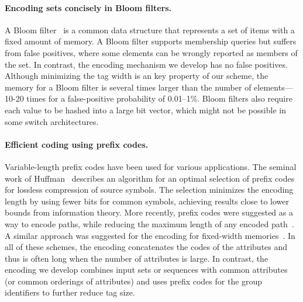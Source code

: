 \paragraph{Encoding sets concisely in Bloom filters.} A Bloom
filter~\cite{Bloom} is a common data structure that represents a set of
items with a fixed amount of memory. A Bloom filter supports membership
queries but suffers from false positives, where some elements can be
wrongly reported as members of the set. In contrast, the encoding
mechanism we develop has no false positives.  Although minimizing the
tag width is an key property of our scheme, the memory for a Bloom
filter is several times larger than the number of elements---10-20 times
for a false-positive probability of 0.01--1\%. Bloom filters also
require each value to be hashed into a large bit vector, which might not
be possible in some switch architectures.

\paragraph{Efficient coding using prefix codes.} Variable-length prefix
codes have been used for various applications. The seminal work of
Huffman~\cite{Huffman} describes an algorithm for an optimal selection
of prefix codes for lossless compression of source symbols. The
selection minimizes the encoding length by using fewer bits for common
symbols, achieving results close to lower bounds from information
theory. More recently, prefix codes were suggested as a way to encode
paths, while reducing the maximum length of any encoded
path~\cite{PathEncoding}. A similar approach was suggested for the
encoding for fixed-width memories~\cite{FixedMemories}. In all of these
schemes, the encoding concatenates the codes of the attributes and thus
is often long when the number of attributes is large. In contrast, the
encoding we develop
combines input sets or sequences with common attributes (or
common orderings of attributes) and uses prefix codes for the
group identifiers to further reduce tag size.

